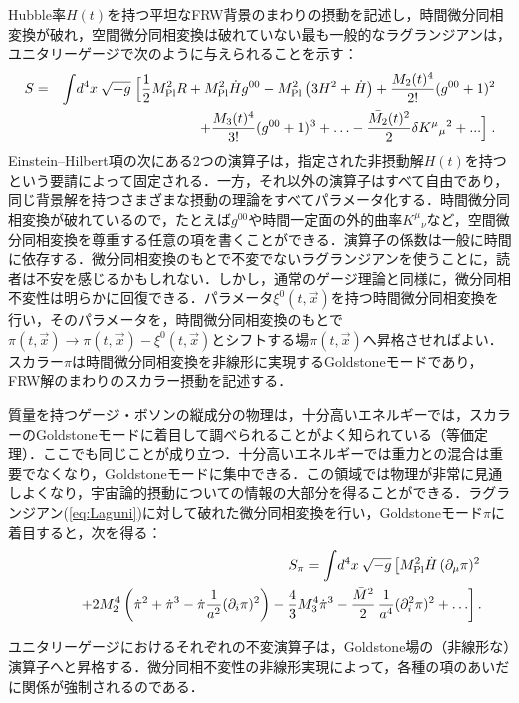 Hubble率$H(t)$を持つ平坦なFRW背景のまわりの摂動を記述し，時間微分同相変換が破れ，空間微分同相変換は破れていない最も一般的なラグランジアンは，ユニタリーゲージで次のように与えられることを示す：
\begin{eqnarray}
\label{eq:Laguni}
S & = & \int  \! d^4 x  \: \sqrt{- g} \;\Big[\frac12 M_{\rm Pl}^2 R+
M_{\rm Pl}^2 \dot{H} g^{00} -  M_{\rm Pl}^2 \left(3
H^2+\dot{H}\right) + \frac{M_2(t)^4}{2!} (g^{00}+1)^2 \\ & & \nonumber + \frac{M_3(t)^4}{3!} (g^{00}+1)^3 + \ldots
-\frac{\bar{M_2}(t)^2}{2}\delta K^\mu {}_\mu {}^2 +... \Big] \; .
\end{eqnarray}
Einstein--Hilbert項の次にある2つの演算子は，指定された非摂動解$H(t)$を持つという要請によって固定される．一方，それ以外の演算子はすべて自由であり，同じ背景解を持つさまざまな摂動の理論をすべてパラメータ化する．時間微分同相変換が破れているので，たとえば$g^{00}$や時間一定面の外的曲率$K^\mu {}_\nu {}$など，空間微分同相変換を尊重する任意の項を書くことができる．演算子の係数は一般に時間に依存する．微分同相変換のもとで不変でないラグランジアンを使うことに，読者は不安を感じるかもしれない．しかし，通常のゲージ理論と同様に，微分同相不変性は明らかに回復できる．パラメータ$\xi^0(t,\vec x)$を持つ時間微分同相変換を行い，そのパラメータを，時間微分同相変換のもとで$\pi(t,\vec{x})\rightarrow \pi(t,\vec{x})-\xi^0(t,\vec{x})$とシフトする場$\pi(t, \vec x)$へ昇格させればよい．スカラー$\pi$は時間微分同相変換を非線形に実現するGoldstoneモードであり，FRW解のまわりのスカラー摂動を記述する．

質量を持つゲージ・ボソンの縦成分の物理は，十分高いエネルギーでは，スカラーのGoldstoneモードに着目して調べられることがよく知られている（等価定理）．ここでも同じことが成り立つ．十分高いエネルギーでは重力との混合は重要でなくなり，Goldstoneモードに集中できる．この領域では物理が非常に見通しよくなり，宇宙論的摂動についての情報の大部分を得ることができる．ラグランジアン(\ref{eq:Laguni})に対して破れた微分同相変換を行い，Goldstoneモード$\pi$に着目すると，次を得る：
\begin{eqnarray} \label{theeffectiveaction} &&S_\pi = \int \! d^4 x \:
\sqrt{-g}\left[ M_{\rm Pl}^2 \dot H
 \, (\partial_\mu \pi)^2\right.\nonumber \\ &&\qquad\left.+2 M^4_2\left(\dot\pi^2+ \dot\pi^3-\dot\pi \frac{1}{a^2}(\partial_i\pi)^2\right)-\frac{ 4}{3} M^4_3 \dot\pi^3 - \frac{\bar M ^2}{2} \,
\frac{1}{a^4}(\partial_i ^2 \pi)^2 +\ldots
\right].
 \end{eqnarray}

ユニタリーゲージにおけるそれぞれの不変演算子は，Goldstone場の（非線形な）演算子へと昇格する．微分同相不変性の非線形実現によって，各種の項のあいだに関係が強制されるのである．


